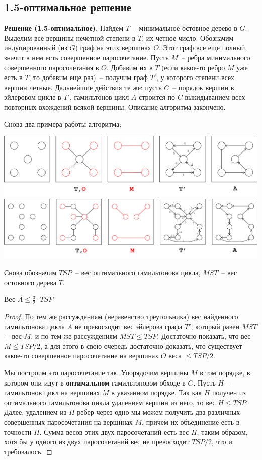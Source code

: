 \subsection{1.5-оптимальное решение}

\textbf{Решение (1.5-оптимальное).} Найдем $T$~-- минимальное остовное дерево в $G$. Выделим все вершины нечетной степени в $T$, их четное число. Обозначим индуцированный (из $G$) граф на этих вершинах $O$. Этот граф все еще полный, значит в нем есть совершенное паросочетание. Пусть $M$~-- ребра минимального совершенного паросочетания в $O$. Добавим их в $T$ (если какое-то ребро $M$ уже есть в $T$, то добавим еще раз)~-- получим граф $T'$, у которого степени всех вершин четные. Дальнейшие действия те же: пусть $C$~-- порядок вершин в эйлеровом цикле в $T'$, гамильтонов цикл $A$ строится по $C$ выкидыванием всех повторных вхождений всякой вершины. Описание алгоритма закончено.

Снова два примера работы алгоритма:

\includegraphics[width=\textwidth]{figures/ex_shorthamil2.png} \\
\includegraphics[width=\textwidth]{figures/ex_longhamil2.png}

Снова обозначим $TSP$~-- вес оптимального гамильтонова цикла, $MST$~-- вес остовного дерева $T$.

\begin{theorem*} Вес $A \leq \frac{3}{2}\cdot TSP$\end{theorem*}
\begin{proof}
По тем же рассуждениям (неравенство треугольника) вес найденного гамильтонова цикла $A$ не превосходит вес эйлерова графа $T'$, который равен $MST$ $+$ вес $M$, и по тем же рассуждениям $MST \leq TSP$. Достаточно показать, что вес $M \leq TSP/2$, а для этого в свою очередь достаточно доказать, что существует какое-то совершенное паросочетание на вершинах $O$ веса $\leq TSP/2$.

Мы построим это паросочетание так. Упорядочим вершины $M$ в том порядке, в котором они идут в \textbf{оптимальном} гамильтоновом обходе в $G$. Пусть $H$~-- гамильтонов цикл на вершинах $M$ в указанном порядке. Так как $H$ получен из оптимального гамильтонова цикла удалением вершин из него, то вес $H \leq TSP$. Далее, удалением из $H$ ребер через одно мы можем получить два различных совершенных паросочетания на вершинах $M$, причем их объединение есть в точности $H$. Сумма весов этих двух паросочетаний есть вес $H$, таким образом, хотя бы у одного из двух паросочетаний вес не превосходит $TSP/2$, что и требовалось.
\end{proof}
